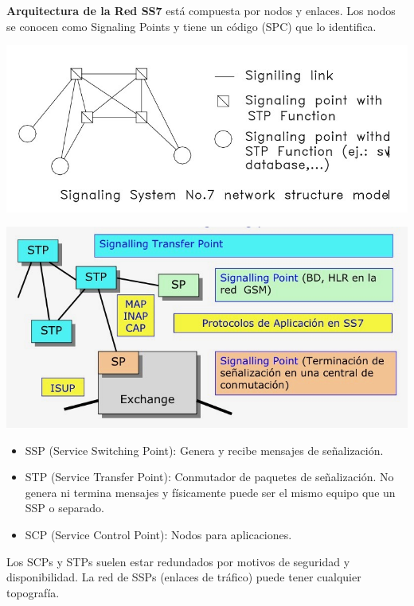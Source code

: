 \documentclass[10pt,portrait, twocolumn]{article}
\begin{document}
\textbf{Arquitectura de la Red SS7} está compuesta por nodos y enlaces. Los nodos se conocen como Signaling Points y tiene un código (SPC) que lo identifica.

	\begin{center}
		\includegraphics[scale = 0.2]{SS7}
	\end{center}
	
	\begin{center}
		\includegraphics[scale = 0.2]{SP}
	\end{center}
	
	\begin{itemize}
		\item SSP (Service Switching Point): Genera y recibe mensajes de señalización.
		\item STP (Service Transfer Point): Conmutador de paquetes de señalización. No genera ni termina mensajes y físicamente puede ser el mismo equipo que un SSP o separado.
		\item SCP (Service Control Point): Nodos para aplicaciones.
	\end{itemize}

Los SCPs y STPs suelen estar redundados por motivos de seguridad y disponibilidad. La red de SSPs (enlaces de tráfico) puede tener cualquier topografía.
\end{document}
